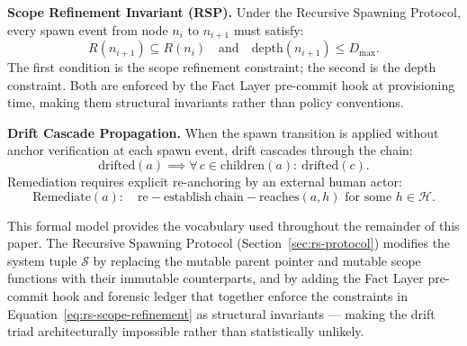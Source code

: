 \medskip
\noindent\textbf{Scope Refinement Invariant (RSP).}
Under the Recursive Spawning Protocol, every spawn event from node $n_i$ to $n_{i+1}$ must satisfy:
\begin{equation}
R(n_{i+1}) \subseteq R(n_i) \quad \text{and} \quad \mathrm{depth}(n_{i+1}) \leq D_{\max}.
\label{eq:rs-scope-refinement}
\end{equation}
The first condition is the scope refinement constraint; the second is the depth constraint. Both are enforced by the Fact Layer pre-commit hook at provisioning time, making them structural invariants rather than policy conventions.

\medskip
\noindent\textbf{Drift Cascade Propagation.}
When the spawn transition is applied without anchor verification at each spawn event, drift cascades through the chain:
\begin{equation}
\mathrm{drifted}(a) \implies \forall\, c \in \mathrm{children}(a):\ \mathrm{drifted}(c).
\label{eq:rs-drift-propagation}
\end{equation}
Remediation requires explicit re-anchoring by an external human actor:
\begin{equation}
\mathrm{Remediate}(a):\quad \mathrm{re-establish}\ \mathrm{chain-reaches}(a, h) \text{ for some } h \in \mathcal{H}.
\label{eq:rs-drift-remediation}
\end{equation}

This formal model provides the vocabulary used throughout the remainder of this paper. The Recursive Spawning Protocol (Section~\ref{sec:rs-protocol}) modifies the system tuple $\mathcal{S}$ by replacing the mutable parent pointer and mutable scope functions with their immutable counterparts, and by adding the Fact Layer pre-commit hook and forensic ledger that together enforce the constraints in Equation~\ref{eq:rs-scope-refinement} as structural invariants — making the drift triad architecturally impossible rather than statistically unlikely.
